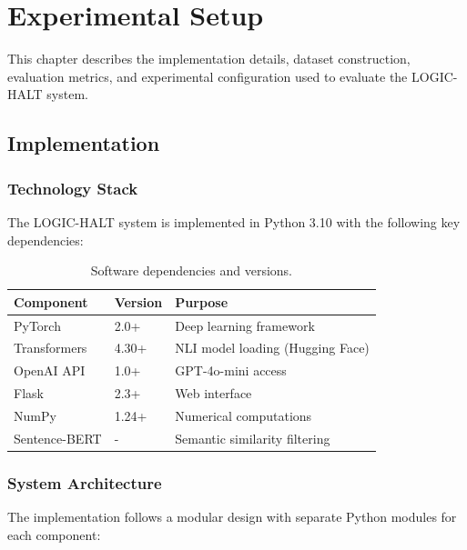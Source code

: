 \chapter{Experimental Setup}

This chapter describes the implementation details, dataset construction, evaluation metrics, and experimental configuration used to evaluate the LOGIC-HALT system.

\section{Implementation}

\subsection{Technology Stack}

The LOGIC-HALT system is implemented in Python 3.10 with the following key dependencies:

\begin{table}[!htbp]
    \centering
    \caption{Software dependencies and versions.}
    \label{tab:dependencies}
    \begin{tabular}{llp{7cm}}
        \toprule
        Component & Version & Purpose \\
        \midrule
        PyTorch & 2.0+ & Deep learning framework \\
        Transformers & 4.30+ & NLI model loading (Hugging Face) \\
        OpenAI API & 1.0+ & GPT-4o-mini access \\
        Flask & 2.3+ & Web interface \\
        NumPy & 1.24+ & Numerical computations \\
        Sentence-BERT & - & Semantic similarity filtering \\
        \bottomrule
    \end{tabular}
\end{table}

\subsection{System Architecture}

The implementation follows a modular design with separate Python modules for each component:

